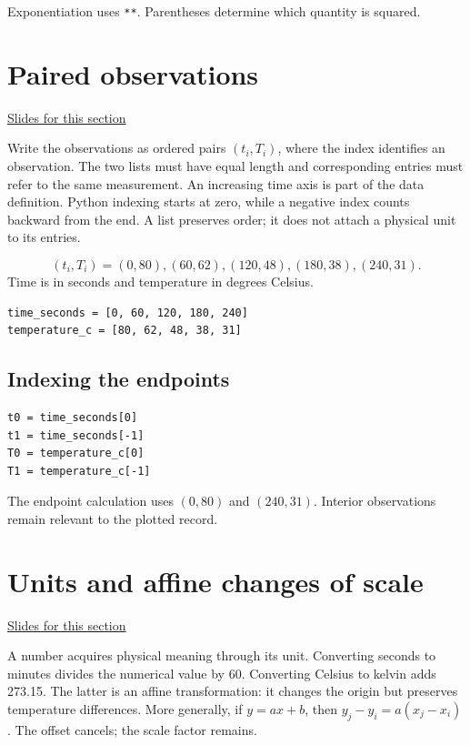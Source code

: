 \documentclass[11pt,letterpaper]{article}
\theoremstyle{definition}\newtheorem{definition}{Definition}\newtheorem{example}{Example}
\numberwithin{equation}{section}
\begin{document}
Exponentiation uses \texttt{**}. Parentheses determine which quantity is squared.
\section{Paired observations}
\hypertarget{note-paired-observations}{}\label{note:paired-observations}
{\small \href{slides.html\#frame=paired-observations\&step=1}{Slides for this section}}\par
Write the observations as ordered pairs $(t_i,T_i)$, where the index identifies an observation. The two lists must have equal length and corresponding entries must refer to the same measurement. An increasing time axis is part of the data definition. Python indexing starts at zero, while a negative index counts backward from the end. A list preserves order; it does not attach a physical unit to its entries.

\[
(t_i,T_i)=(0,80),(60,62),(120,48),(180,38),(240,31).
\]
Time is in seconds and temperature in degrees Celsius.

\begin{minipage}{\linewidth}
\begin{verbatim}
time_seconds = [0, 60, 120, 180, 240]
temperature_c = [80, 62, 48, 38, 31]
\end{verbatim}
\end{minipage}

\subsection*{Indexing the endpoints}
\begin{minipage}{\linewidth}
\begin{verbatim}
t0 = time_seconds[0]
t1 = time_seconds[-1]
T0 = temperature_c[0]
T1 = temperature_c[-1]
\end{verbatim}
\end{minipage}

The endpoint calculation uses $(0,80)$ and $(240,31)$. Interior observations remain relevant to the plotted record.
\section{Units and affine changes of scale}
\hypertarget{note-units-and-affine-changes-of-scale}{}\label{note:units-and-affine-changes-of-scale}
{\small \href{slides.html\#frame=units-and-affine-changes-of-scale\&step=1}{Slides for this section}}\par
A number acquires physical meaning through its unit. Converting seconds to minutes divides the numerical value by 60. Converting Celsius to kelvin adds 273.15. The latter is an affine transformation: it changes the origin but preserves temperature differences. More generally, if $y=ax+b$, then $y_j-y_i=a(x_j-x_i)$. The offset cancels; the scale factor remains.
\end{document}
